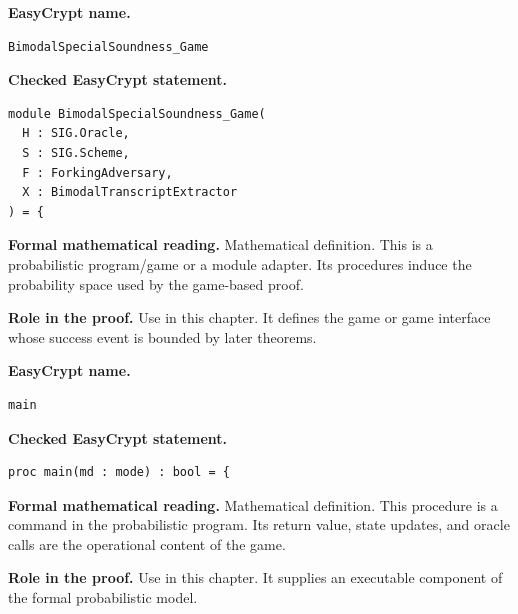 \begin{formaldefinition}
\noindent\textbf{EasyCrypt name.}
\begin{lstlisting}[language=EasyCrypt,basicstyle=\ttfamily\scriptsize]
BimodalSpecialSoundness_Game
\end{lstlisting}
\noindent\textbf{Checked EasyCrypt statement.}
\begin{lstlisting}[language=EasyCrypt,basicstyle=\ttfamily\scriptsize]
module BimodalSpecialSoundness_Game(
  H : SIG.Oracle,
  S : SIG.Scheme,
  F : ForkingAdversary,
  X : BimodalTranscriptExtractor
) = {
\end{lstlisting}
\noindent\textbf{Formal mathematical reading.}
Mathematical definition. This is a probabilistic program/game or a module adapter.  Its procedures induce the probability space used by the game-based proof.

\noindent\textbf{Role in the proof.}
Use in this chapter. It defines the game or game interface whose success event is bounded by later theorems.

\end{formaldefinition}

\begin{formaldefinition}
\noindent\textbf{EasyCrypt name.}
\begin{lstlisting}[language=EasyCrypt,basicstyle=\ttfamily\scriptsize]
main
\end{lstlisting}
\noindent\textbf{Checked EasyCrypt statement.}
\begin{lstlisting}[language=EasyCrypt,basicstyle=\ttfamily\scriptsize]
proc main(md : mode) : bool = {
\end{lstlisting}
\noindent\textbf{Formal mathematical reading.}
Mathematical definition. This procedure is a command in the probabilistic program.  Its return value, state updates, and oracle calls are the operational content of the game.

\noindent\textbf{Role in the proof.}
Use in this chapter. It supplies an executable component of the formal probabilistic model.

\end{formaldefinition}

